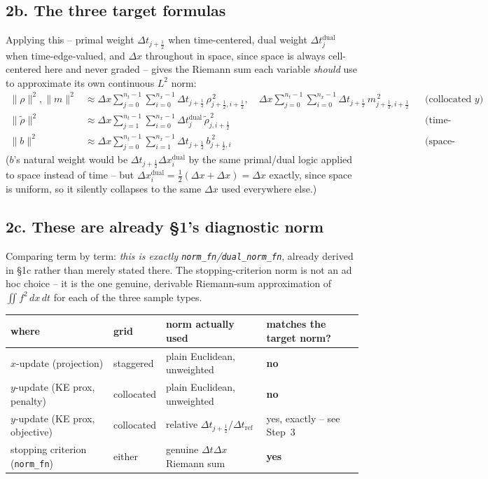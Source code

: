 \documentclass[11pt]{article}
\newcommand{\dt}{\Delta t}
\newcommand{\dx}{\Delta x}
\newcommand{\code}[1]{\texttt{#1}}
\newcommand{\half}{\tfrac12}
\begin{document}
\subsection*{2b. The three target formulas}

Applying this -- primal weight $\dt_{j+\half}$ when time-centered, dual weight $\dt_j^\mathrm{dual}$
when time-edge-valued, and $\dx$ throughout in space, since space is always cell-centered here and
never graded -- gives the Riemann sum each variable \emph{should} use to approximate its own
continuous $L^2$ norm:
\begin{align*}
  \|\rho\|^2, \|m\|^2 &\approx \dx\sum_{j=0}^{n_t-1}\sum_{i=0}^{n_x-1} \dt_{j+\half}\,
    \rho_{j+\half,i+\half}^{\,2}, \quad \dx\sum_{j=0}^{n_t-1}\sum_{i=0}^{n_x-1}\dt_{j+\half}\,m_{j+\half,i+\half}^{\,2}
    && \text{(collocated $y$)} \\
  \|\tilde\rho\|^2 &\approx \dx\sum_{j=1}^{n_t-1}\sum_{i=0}^{n_x-1} \dt_j^\mathrm{dual}\,
    \tilde\rho_{j,i+\half}^{\,2} && \text{(time-staggered)} \\
  \|b\|^2 &\approx \dx\sum_{j=0}^{n_t-1}\sum_{i=1}^{n_x-1} \dt_{j+\half}\,
    b_{j+\half,i}^{\,2} && \text{(space-staggered)}
\end{align*}
($b$'s natural weight would be $\dt_{j+\half}\dx_i^\mathrm{dual}$ by the same primal/dual logic
applied to space instead of time -- but $\dx_i^\mathrm{dual}=\half(\dx+\dx)=\dx$ exactly, since
space is uniform, so it silently collapses to the same $\dx$ used everywhere else.)

\subsection*{2c. These are already \S1's diagnostic norm}

Comparing term by term: \emph{this is exactly \code{norm\_fn}/\code{dual\_norm\_fn}}, already
derived in \S1c rather than merely stated there. The stopping-criterion norm is not an ad hoc
choice -- it is the one genuine, derivable Riemann-sum approximation of $\iint f^2\,dx\,dt$ for
each of the three sample types.

\begin{center}
\small
\begin{tabular}{@{}p{}p{}p{}p{}@{}}
\toprule
where & grid & norm actually used & matches the target norm? \\
\midrule
$x$-update (projection) & staggered & plain Euclidean, unweighted & \textbf{no} \\[2pt]
$y$-update (KE prox, penalty) & collocated & plain Euclidean, unweighted & \textbf{no} \\[2pt]
$y$-update (KE prox, objective) & collocated & relative $\dt_{j+\half}/\dt_\mathrm{ref}$ & yes, exactly -- see Step~3 \\[2pt]
stopping criterion (\code{norm\_fn}) & either & genuine $\dt\dx$ Riemann sum & \textbf{yes} \\
\bottomrule
\end{tabular}
\end{center}
\end{document}
